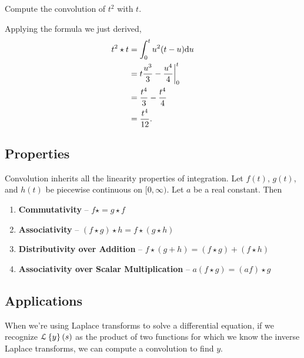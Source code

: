 \begin{example}
	Compute the convolution of $t^2$ with $t$.
\end{example}
\noindent
Applying the formula we just derived,
\begin{align*}
	t^2 \star t &= \int_{0}^{t}{u^2(t-u)\mathrm{d} u} \\
	&= t\frac{u^3}{3} - \frac{u^4}{4} \bigg\rvert_{0}^{t} \\
	&= \frac{t^4}{3} - \frac{t^4}{4} \\
	&= \frac{t^4}{12}. 
\end{align*}

\subsection{Properties}
Convolution inherits all the linearity properties of integration.
Let $f(t)$, $g(t)$, and $h(t)$ be piecewise continuous on $[0,\infty)$.
Let $a$ be a real constant.
Then
\begin{enumerate}[label=]
	\item \textbf{Commutativity} -- $f \star = g \star f$
	\item \textbf{Associativity} -- $(f \star g) \star h = f \star (g \star h)$
	\item \textbf{Distributivity over Addition} -- $f \star (g + h) = (f \star g) + (f \star h)$
	\item \textbf{Associativity over Scalar Multiplication} -- $a(f \star g) = (af) \star g$
\end{enumerate}

\subsection{Applications}
When we're using Laplace transforms to solve a differential equation, if we recognize $\mathcal{L}\left\{ y \right\}\left(s\right)$ as the product of two functions for which we know the inverse Laplace transforms, we can compute a convolution to find $y$.

